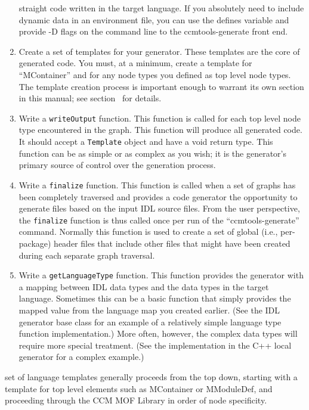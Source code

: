 \begin{enumerate}
      straight code written in the target language. If you absolutely need to
      include dynamic data in an environment file, you can use the defines
      variable and provide -D flags on the command line to the ccmtools-generate
      front end.
\item Create a set of templates for your generator. These templates are the core
      of generated code. You must, at a minimum, create a template for
      ``MContainer'' and for any node types you defined as top level node types.
      The template creation process is important enough to warrant its own
      section in this manual; see section~\cite{subsec:template-writing} for
      details.
\item Write a {\tt writeOutput} function. This function is called for each top
      level node type encountered in the graph. This function will produce all
      generated code. It should accept a {\tt Template} object and have a void
      return type. This function can be as simple or as complex as you wish; it
      is the generator's primary source of control over the generation process.
\item Write a {\tt finalize} function. This function is called when a set of
      graphs has been completely traversed and provides a code generator the
      opportunity to generate files based on the input IDL source files. From
      the user perspective, the {\tt finalize} function is thus called once per
      run of the ``ccmtools-generate'' command. Normally this function is used
      to create a set of global (i.e., per-package) header files that include
      other files that might have been created during each separate graph
      traversal.
\item Write a {\tt getLanguageType} function. This function provides the
      generator with a mapping between IDL data types and the data types in the
      target language. Sometimes this can be a basic function that simply
      provides the mapped value from the language map you created earlier. (See
      the IDL generator base class for an example of a relatively simple
      language type function implementation.) More often, however, the complex
      data types will require more special treatment. (See the implementation in
      the C++ local generator for a complex example.)
\end{enumerate}

set of language templates generally proceeds from the top down, starting with a
template for top level elements such as MContainer or MModuleDef, and proceeding
through the CCM MOF Library in order of node specificity.

